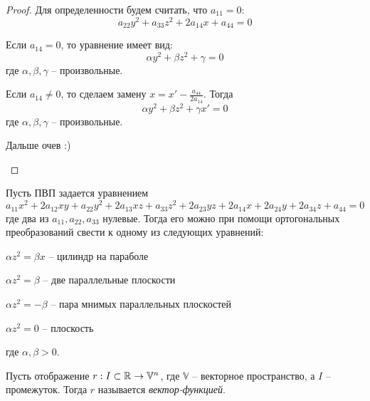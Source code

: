 \begin{proof}
	Для определенности будем считать, что $a_{11} = 0$:
	\[a_{22} y^2 + a_{33} z^2 + 2a_{14} x + a_{44} = 0\]
	\begin{MyItemize}
		\item Если $a_{14} = 0$, то уравнение имеет вид:
		\[\alpha y^2 + \beta z^2 + \gamma = 0\]
		где $\alpha, \beta, \gamma$ -- произвольные.

		\item Если $a_{14} \neq 0$, то сделаем замену $x = x' - \frac{a_{44}}{2a_{14}}$. Тогда 
		\[\alpha y^2 + \beta z^2 + \gamma x' = 0 \]
		где $\alpha, \beta, \gamma$ -- произвольные.

		Дальше очев :)
	\end{MyItemize}
\end{proof}

\begin{figure}[H]
	\centering
	\def\svgwidth{.7\columnwidth}
	
\end{figure}

\begin{Thm}
	Пусть ПВП задается уравнением
	\[a_{11} x^2 + 2a_{12} xy + a_{22} y^2 + 2a_{13} xz + a_{33} z^2 + 2a_{23} yz + 2a_{14} x + 2a_{24} y + 2a_{34} z + a_{44} = 0\]
	где два из $a_{11}, a_{22}, a_{33}$ нулевые. Тогда его можно при помощи ортогональных преобразований свести к одному из следующих уравнений:

	\begin{MyList}
		\item $\alpha z^2 = \beta x$ -- цилиндр на параболе
		\item $\alpha z^2 = \beta$ -- две параллельные плоскости
		\item $\alpha z^2 = -\beta$ -- пара мнимых параллельных плоскостей
		\item $\alpha z^2 = 0$ -- плоскость
	\end{MyList}
	где $\alpha, \beta > 0$.
\end{Thm}

\begin{figure}[H]
	\centering
	\def\svgwidth{\columnwidth}
	
\end{figure}



\begin{Def}
	Пусть отображение $r : I \subset \mathbb{R} \to \mathbb{V}^n$, где $\mathbb{V}$ -- векторное пространство, а $I$ -- промежуток.
	Тогда $r$ называется \textit{вектор-функцией}.  
\end{Def}

